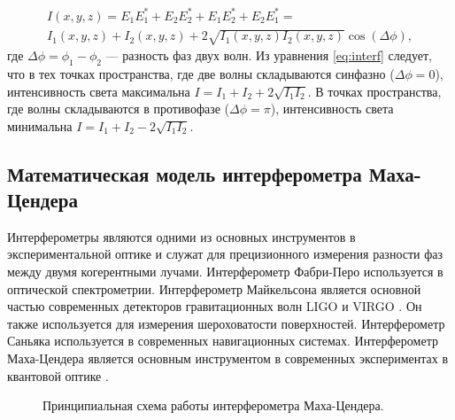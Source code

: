 \begin{multline}
    I(x, y, z) = E_1E_1^* + E_2E_2^* + E_1E_2^* + E_2E_1^* = \\
    I_1(x,y,z) + I_2(x,y,z) + 2 \sqrt{I_1(x,y,z)I_2(x,y,z)}\cos(\Delta \phi),
\label{eq:interf}
\end{multline}
где $\Delta \phi = \phi_1 - \phi_2$ --- разность фаз двух волн. Из уравнения \eqref{eq:interf} следует, что в тех точках пространства, где две волны складываются синфазно ($\Delta \phi = 0$), интенсивность света максимальна $I = I_1 + I_2 + 2\sqrt{I_1I_2}$. В точках пространства, где волны складываются в противофазе ($\Delta \phi = \pi$), интенсивность света минимальна $I = I_1 + I_2 - 2\sqrt{I_1I_2}$.

\subsection{Математическая модель интерферометра Маха-Цендера}\label{sec:ch2/sec1/subsec2}

Интерферометры являются одними из основных инструментов в экспериментальной оптике и служат для прецизионного измерения разности фаз между двумя когерентными лучами.  Интерферометр Фабри-Перо\cite{fabry-perot1899} используется в оптической спектрометрии. Интерферометр Майкельсона является основной частью современных детекторов гравитационных волн LIGO и VIRGO \cite{LIGO, VIRGO}. Он также используется для измерения шероховатости поверхностей. Интерферометр Саньяка используется в современных навигационных системах. Интерферометр Маха-Цендера является основным инструментом в современных экспериментах в квантовой оптике \cite{Sarkar2006, Sychev2017}. 

\begin{figure}[ht]
\caption{Принципиальная схема работы интерферометра Маха-Цендера.}
\label{fig:MZI}
\end{figure}

